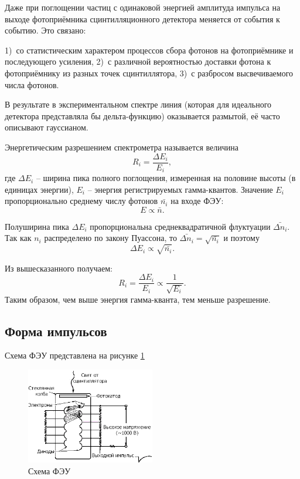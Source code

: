 \documentclass[a4paper, 12pt]{article}
\begin{document}
            Даже при поглощении частиц с одинаковой энергией амплитуда импульса на выходе фотоприёмника сцинтилляционного детектора меняется от события к событию. Это связано:

            1)~со статистическим характером процессов сбора фотонов на фотоприёмнике и последующего усиления,
            2)~с различной вероятностью доставки фотона к фотоприёмнику из разных точек сцинтиллятора,
            3)~с разбросом высвечиваемого числа фотонов.

            В результате в экспериментальном спектре линия (которая для идеального детектора представляла бы дельта-функцию) оказывается размытой, её часто описывают гауссианом.

            Энергетическим разрешением спектрометра называется величина
            $$
                R_i = \frac{\Delta E_i}{E_i},
            $$
            где $\Delta E_i$ -- ширина пика полного поглощения, измеренная на половине высоты (в единицах энергии), $E_i$ -- энергия регистрируемых гамма-квантов. Значение $E_i$ пропорционально среднему числу фотонов $\bar{n_i}$ на входе ФЭУ:
            $$
                E \propto \bar{n}.
            $$

            Полуширина пика $\Delta E_i$ пропорциональна среднеквадратичной флуктуации $\bar{\Delta n_i}$. Так как $n_i$ распределено по закону Пуассона, то $\bar{\Delta n_i} = \sqrt{\bar{n_i}}$ и поэтому
            $$
                \Delta E_i \propto \sqrt{\bar{n_i}}.
            $$

            Из вышесказанного получаем:
            $$
                R_i = \frac{\Delta E_i}{E_i} \propto \frac{1}{\sqrt{E_i}}.
            $$
            Таким образом, чем выше энергия гамма-кванта, тем меньше разрешение.

        \subsection{Форма импульсов}

            Схема ФЭУ представлена на рисунке \ref{img:FEU}

            \begin{figure}[h!]
                \begin{center}
                    \includegraphics[width = 0.5\textwidth]{img/FEU.png}
                    \caption{Схема ФЭУ}
                    \label{img:FEU}
                \end{center}
            \end{figure}
\end{document}
